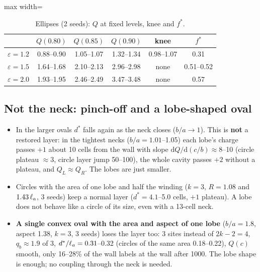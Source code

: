 \begin{table}[H]\centering\small
\caption{Ellipses (2 seeds): $Q$ at fixed levels, knee and $f^*$.}\label{tab:ell}
\begin{adjustbox}{max width=\textwidth}
\begin{tabular}{lccccc}\toprule
& $Q(0.80)$ & $Q(0.85)$ & $Q(0.90)$ & knee & $f^*$\\\midrule
$\varepsilon=1.2$ & 0.88--0.90 & 1.05--1.07 & 1.32--1.34 & 0.98--1.07 & 0.31\\
$\varepsilon=1.5$ & 1.64--1.68 & 2.10--2.13 & 2.96--2.98 & none & 0.51--0.52\\
$\varepsilon=2.0$ & 1.93--1.95 & 2.46--2.49 & 3.47--3.48 & none & 0.57\\\bottomrule
\end{tabular}
\end{adjustbox}
\end{table}

\subsection{Not the neck: pinch-off and a lobe-shaped oval}
\begin{itemize}
  \item In the larger ovals $d^*$ falls again as the neck closes ($b/a\to1$). This is \textbf{not} a restored layer: in the tightest necks
        ($b/a=1.01$--1.05) each lobe's charge passes $+1$ about 10 cells from the wall with slope $\mathrm{d}Q/\mathrm{d}(c/b)\approx8$--10
        (circle plateau $\approx3$, circle layer jump 50--100), the whole cavity passes $+2$ without a plateau, and $Q_L\approx Q_R$. The
        lobes are just smaller.
  \item Circles with the area of one lobe and half the winding ($k=3$, $R=1.08$ and $1.43\,\ell_a$, 3 seeds) keep a normal layer
        ($d^*=4.1$--5.0 cells, $+1$ plateau). A lobe does not behave like a circle of its size, even with a 13-cell neck.
  \item \textbf{A single convex oval with the area and aspect of one lobe} ($b/a=1.8$, aspect 1.38, $k=3$, 3 seeds) loses the layer too:
        3 sites instead of $2k-2=4$, $q_b\approx1.9$ of 3, $d^*/\ell_a=0.31$--0.32 (circles of the same area 0.18--0.22), $Q(c)$ smooth,
        only 16--28\% of the wall labels at the wall after 1000. The lobe shape is enough; no coupling through the neck is needed.
\end{itemize}

